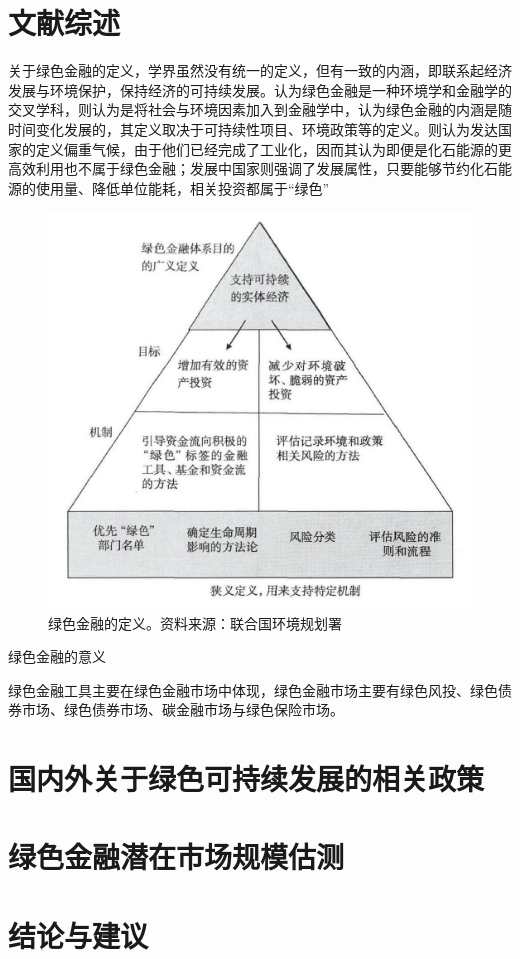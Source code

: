 \documentclass[a4paper,12pt]{ctexart}
\begin{document}
\section*{文献综述}
关于绿色金融的定义，学界虽然没有统一的定义，但有一致的内涵，即联系起经济发展与环境保护，保持经济的可持续发展\cite{雷立钧2009绿色金融文献综述}。\citet{cowan1998topical}认为绿色金融是一种环境学和金融学的交叉学科，\citet{gray2002messiness}则认为是将社会与环境因素加入到金融学中，\citet{hohne2012mapping}认为绿色金融的内涵是随时间变化发展的，其定义取决于可持续性项目、环境政策等的定义。\citet*{张承惠2016发展中国绿色金融的逻辑与框架}则认为发达国家的定义偏重气候，由于他们已经完成了工业化，因而其认为即便是化石能源的更高效利用也不属于绿色金融；发展中国家则强调了发展属性，只要能够节约化石能源的使用量、降低单位能耗，相关投资都属于“绿色”
\begin{figure}[H]
    \centering
    \includegraphics[width=0.5\linewidth]{./img/绿色金融定义.jpeg}
    \caption{绿色金融的定义。资料来源：联合国环境规划署}
\end{figure}

绿色金融的意义

绿色金融工具主要在绿色金融市场中体现，绿色金融市场主要有绿色风投、绿色债券市场、绿色债券市场、碳金融市场与绿色保险市场\cite{姚秋池2017国内外绿色金融研究综述}。

\section*{国内外关于绿色可持续发展的相关政策}

\section*{绿色金融潜在市场规模估测}

\section*{结论与建议}

\nocite{*}
\printbibliography
\end{document}
